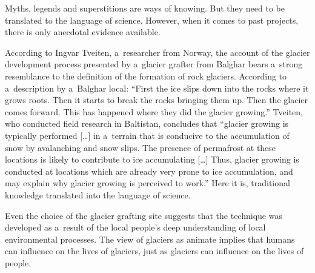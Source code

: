 Myths, legends and superstitions are ways of knowing. But they need to be translated to the language of science.
However, when it comes to past projects, there is only anecdotal evidence available.

According to Ingvar Tveiten, a researcher from Norway, the account of the glacier development process presented
by a glacier grafter from Balghar bears a strong resemblance to the definition of the formation of rock
glaciers. According to a description by a Balghar local: “First the ice slips down into the rocks where it grows
roots. Then it starts to break the rocks bringing them up. Then the glacier comes forward. This has happened
where they did the glacier growing.” Tveiten, who conducted field research in Baltistan, concludes that “glacier
growing is typically performed […] in a terrain that is conducive to the accumulation of snow by avalanching and
snow slips. The presence of permafrost at these locations is likely to contribute to ice accumulating […] Thus,
glacier growing is conducted at locations which are already very prone to ice accumulation, and may explain why
glacier growing is perceived to work.” Here it is, traditional knowledge translated into the language of
science.

Even the choice of the glacier grafting site suggests that the technique was developed as a result of the local
people’s deep understanding of local environmental processes. The view of glaciers as animate implies that
humans can influence on the lives of glaciers, just as glaciers can influence on the lives of people.

